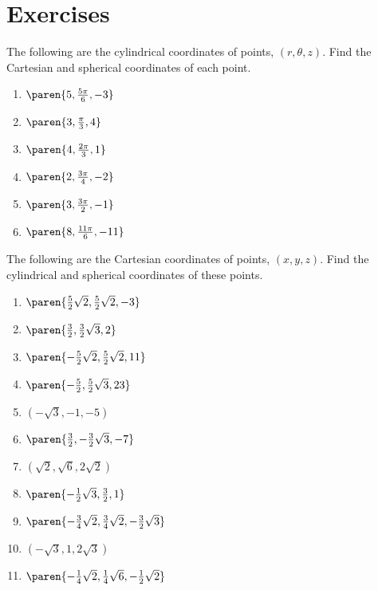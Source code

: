 \section*{Exercises}


\begin{ex} The following are the cylindrical coordinates of points, $(
r,\theta,z)$. Find the Cartesian and spherical coordinates of each point.

\begin{enumerate}
\item $\paren{5,\frac{5\pi }{6},-3} $

\item $\paren{3,\frac{\pi }{3},4} $

\item $\paren{4,\frac{2\pi }{3},1} $

\item $\paren{2,\frac{3\pi }{4},-2} $

\item $\paren{3,\frac{3\pi }{2},-1} $

\item $\paren{8,\frac{11\pi }{6},-11} $
\end{enumerate}
\end{ex}

\begin{ex} The following are the Cartesian coordinates of points, $(
x,y,z)$. Find the cylindrical and spherical coordinates of these
points.

\begin{enumerate}
\item $\paren{\frac{5}{2}\sqrt{2},\frac{5}{2}\sqrt{2},-3} $

\item $\paren{\frac{3}{2},\frac{3}{2}\sqrt{3},2} $

\item $\paren{-\frac{5}{2}\sqrt{2},\frac{5}{2}\sqrt{2},11} $

\item $\paren{-\frac{5}{2},\frac{5}{2}\sqrt{3},23} $

\item $(-\sqrt{3},-1,-5) $

\item $\paren{\frac{3}{2},-\frac{3}{2}\sqrt{3},-7} $

\item $(\sqrt{2},\sqrt{6},2\sqrt{2}) $

\item $\paren{-\frac{1}{2}\sqrt{3},\frac{3}{2},1} $

\item $\paren{-\frac{3}{4}\sqrt{2},\frac{3}{4}\sqrt{2},-\frac{3}{2}\sqrt{3}} $

\item $(-\sqrt{3},1,2\sqrt{3}) $

\item $\paren{-\frac{1}{4}\sqrt{2},\frac{1}{4}\sqrt{6},-\frac{1}{2}\sqrt{2}} $
\end{enumerate}
\end{ex}

